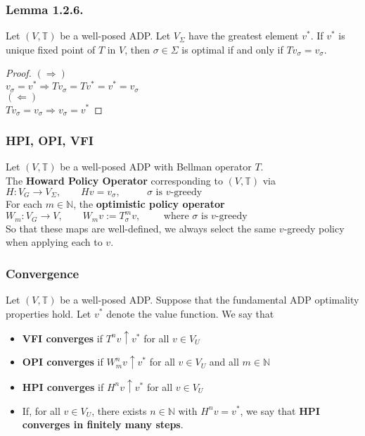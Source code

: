 \documentclass[11pt,xcolor={dvipsnames},hyperref={pdftex,pdfpagemode=UseNone,hidelinks,pdfdisplaydoctitle=true},usepdftitle=false]{beamer}
\begin{document}
\begin{frame}
\frametitle{Lemma 1.2.6.}
Let $(V,\mathbb{T})$ be a well-posed ADP. Let $V_\Sigma$ have the greatest element $v^*$. If $v^*$ is unique fixed point of $T$ in $V$, then $\sigma\in\Sigma$ is optimal if and only if $T v_\sigma = v_\sigma$.
\begin{proof}
$(\Rightarrow)$\\
$v_\sigma = v^*\Rightarrow Tv_\sigma = Tv^* = v^*=v_\sigma$\\
$(\Leftarrow)$\\
$T v_\sigma = v_\sigma \Rightarrow v_\sigma=v^*$
\end{proof}
\end{frame}


\begin{frame}
\end{frame}


\begin{frame}
\frametitle{HPI, OPI, VFI}
\begin{definition}
Let $(V,\mathbb{T})$ be a well-posed ADP with Bellman operator $T$.\\
The \textbf{Howard Policy Operator} corresponding to $(V,\mathbb{T})$ via\\
$H: V_G\to V_\Sigma,\qquad Hv = v_\sigma,\qquad\text{ $\sigma$ is $v$-greedy}$\\
For each $m\in\mathbb{N}$, the \textbf{optimistic policy operator}\\
$W_m: V_G\to V,\qquad W_mv:= T^m_\sigma v,\qquad\text{ where $\sigma$ is $v$-greedy}$\\
So that these maps are well-defined, we always select the same $v$-greedy policy when applying each to $v$.
\end{definition}
\end{frame}

\begin{frame}
\frametitle{Convergence}
Let $(V,\mathbb{T})$ be a well-posed ADP.  Suppose that the fundamental ADP optimality properties hold. Let $v^*$ denote the value function. We say that
\begin{itemize}
\item \textbf{VFI converges} if $T^nv\uparrow v^*$ for all $v\in V_U$
\item \textbf{OPI converges} if $W_m^nv\uparrow v^*$ for all $v\in V_U$ and all $m\in\mathbb{N}$
\item \textbf{HPI converges} if $H^nv\uparrow v^*$ for all $v\in V_U$
\item If, for all $v\in V_U$, there exists $n\in\mathbb{N}$ with $H^nv=v^*$, we say that \textbf{HPI converges in finitely many steps}. 
\end{itemize}
\end{frame}
\end{document}
